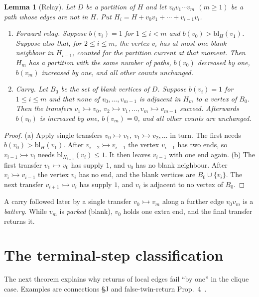 \documentclass[11pt]{amsart}
\newtheorem{lemma}[theorem]{Lemma}
\theoremstyle{definition}
\newcommand{\tr}{\rightarrowtail}   %
\newcommand{\bl}{\mathrm{bl}}
\begin{document}
\begin{lemma}[Relay]\label{lem:relay}
Let $D$ be a partition of $H$ and let $v_0v_1\cdots v_m$ $(m\ge1)$ be a path whose edges are not
in $H$. Put $H_i=H+v_0v_1+\cdots+v_{i-1}v_i$.
\begin{enumerate}[label=(\alph*)]
\item \emph{Forward relay.} Suppose $b(v_i)=1$ for $1\le i<m$ and $b(v_0)>\bl_{H}(v_1)$.
Suppose also that, for $2\le i\le m$, the vertex $v_i$ has at most one blank neighbour in
$H_{i-1}$, counted for the partition current at that moment. Then $H_m$ has a partition with the
same number of paths, $b(v_0)$ decreased by one, $b(v_m)$ increased by one, and all other counts
unchanged.
\item \emph{Carry.} Let $B_0$ be the set of blank vertices of $D$. Suppose $b(v_i)=1$ for
$1\le i\le m$ and that none of $v_0,\dots,v_{m-1}$ is adjacent in $H_m$ to a vertex of $B_0$.
Then the transfers $v_1\tr v_0,\ v_2\tr v_1,\dots,v_m\tr v_{m-1}$ succeed. Afterwards $b(v_0)$ is
increased by one, $b(v_m)=0$, and all other counts are unchanged.
\end{enumerate}
\end{lemma}
\begin{proof}
(a) Apply single transfers $v_0\tr v_1,\ v_1\tr v_2,\dots$ in turn. The first needs
$b(v_0)>\bl_H(v_1)$. After $v_{i-2}\tr v_{i-1}$ the vertex $v_{i-1}$ has two ends, so
$v_{i-1}\tr v_i$ needs $\bl_{H_{i-1}}(v_i)\le 1$. It then leaves $v_{i-1}$ with one end again.
(b) The first transfer $v_1\tr v_0$ has supply $1$, and $v_0$ has no blank neighbour. After
$v_i\tr v_{i-1}$ the vertex $v_i$ has no end, and the blank vertices are $B_0\cup\{v_i\}$. The
next transfer $v_{i+1}\tr v_i$ has supply $1$, and $v_i$ is adjacent to no vertex of $B_0$.
\end{proof}

A carry followed later by a single transfer $v_0\tr v_m$ along a further edge $v_0v_m$ is a
\emph{battery}. While $v_m$ is \emph{parked} (blank), $v_0$ holds one extra end, and the final
transfer returns it.

\section{The terminal-step classification}\label{sec:terminal}

The next theorem explains why returns of local edges fail ``by one'' in the clique case. Examples
are connections \S J and false-twin-return Prop.~4~\cite{FTR}.
\end{document}
